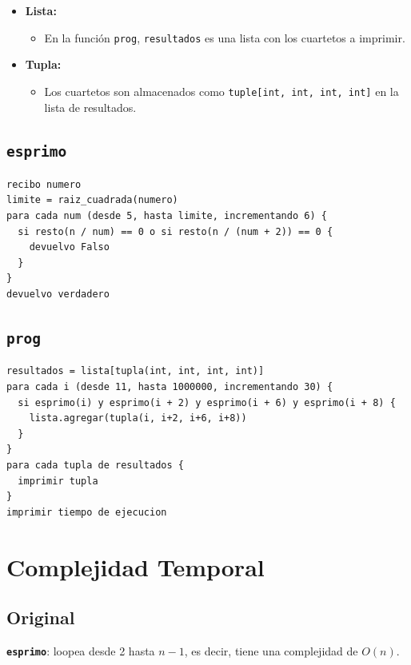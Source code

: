 \documentclass[12pt,a4paper]{article}
\begin{document}
\begin{itemize}
  \item \textbf{Lista:}
    \begin{itemize}
      \item En la función \texttt{prog}, \texttt{resultados} es una lista con los cuartetos a imprimir.
    \end{itemize}
  \item \textbf{Tupla:}
    \begin{itemize}
      \item Los cuartetos son almacenados como \texttt{tuple[int, int, int, int]} en la lista de resultados.
    \end{itemize}
\end{itemize}

\subsection{\texttt{esprimo}}

\begin{lstlisting}
recibo numero
limite = raiz_cuadrada(numero)
para cada num (desde 5, hasta limite, incrementando 6) {
  si resto(n / num) == 0 o si resto(n / (num + 2)) == 0 {
    devuelvo Falso
  }
}
devuelvo verdadero
\end{lstlisting}

\subsection{\texttt{prog}}

\begin{lstlisting}
resultados = lista[tupla(int, int, int, int)]
para cada i (desde 11, hasta 1000000, incrementando 30) {
  si esprimo(i) y esprimo(i + 2) y esprimo(i + 6) y esprimo(i + 8) {
    lista.agregar(tupla(i, i+2, i+6, i+8))
  }
}
para cada tupla de resultados {
  imprimir tupla
}
imprimir tiempo de ejecucion
\end{lstlisting}

\section{Complejidad Temporal}

\subsection{Original}

\textbf{\texttt{esprimo}}: loopea desde 2 hasta $n-1$, es decir, tiene una complejidad de $O(n)$.
\end{document}
